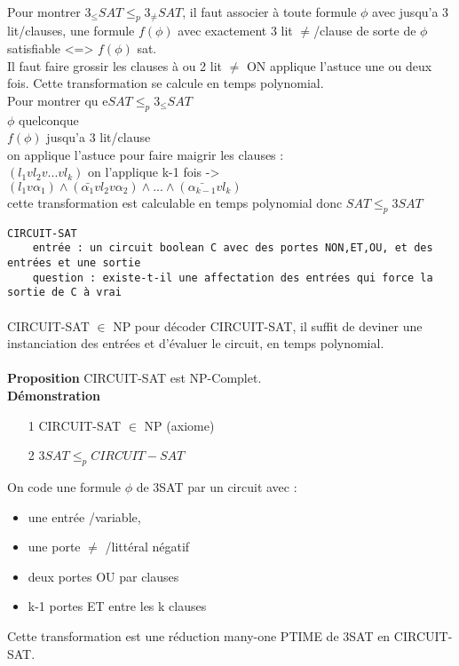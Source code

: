 \documentclass{article}
\begin{document}
\paragraph{} Pour montrer  $3_{\leq}SAT \leq_p 3_{\neq}SAT$, il faut associer à toute formule $\phi$ avec jusqu'a 3 lit/clauses, une formule $f(\phi)$ avec exactement 3 lit $\neq$/clause de sorte de $\phi$ satisfiable <=> $f(\phi)$ sat.\\Il faut faire grossir les clauses à  ou  2 lit $\neq$ ON applique l'astuce une ou deux fois. Cette transformation se calcule en temps polynomial.\\Pour montrer qu e$SAT \leq_p 3_{\leq}SAT$ \\$\phi$ quelconque\\$f(\phi)$ jusqu'a 3 lit/clause\\on applique l'astuce pour faire maigrir les clauses : \\$(l_1 v l_2 v ... v l_k)$  on l'applique k-1 fois -> $(l_1 v \alpha_1) \wedge (\bar{\alpha_1} v l_2 v \alpha_2) \wedge ...\wedge (\bar{\alpha_{k-1}} v l_k)$\\cette transformation est calculable en temps polynomial donc $SAT \leq_p 3SAT$\\
\begin{verbatim}
CIRCUIT-SAT
	entrée : un circuit boolean C avec des portes NON,ET,OU, et des entrées et une sortie
	question : existe-t-il une affectation des entrées qui force la sortie de C à vrai
\end{verbatim}

\paragraph{}CIRCUIT-SAT $\in$ NP pour décoder CIRCUIT-SAT, il suffit de deviner une instanciation des entrées et d'évaluer le circuit, en temps polynomial.\\\\\textbf{Proposition} CIRCUIT-SAT est NP-Complet.\\\textbf{Démonstration} \begin{itemize}
\item[1] CIRCUIT-SAT $\in$ NP (axiome)
\item[2] $3SAT \leq_p CIRCUIT-SAT$ 
\end{itemize}
On code une formule $\phi$ de 3SAT par un circuit avec : 
\begin{itemize}
\item une entrée /variable, 
\item une porte $\neq$ /littéral négatif
\item deux portes OU par clauses
\item k-1 portes ET entre les k clauses
\end{itemize}
Cette transformation est une réduction many-one PTIME de 3SAT en CIRCUIT-SAT.
\end{document}
